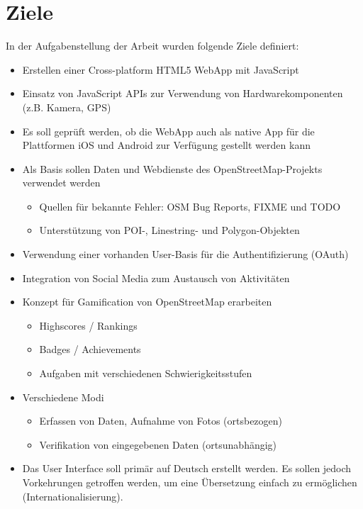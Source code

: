 \section{Ziele}
In der Aufgabenstellung der Arbeit wurden folgende Ziele definiert:
\begin{itemize}
	\item Erstellen einer Cross-platform HTML5 WebApp mit JavaScript
	\item Einsatz von JavaScript APIs zur Verwendung von Hardwarekomponenten (z.B. Kamera, GPS)
	\item Es soll geprüft werden, ob die WebApp auch als native App für die Plattformen iOS und Android zur Verfügung gestellt werden kann 
	\item Als Basis sollen Daten und Webdienste des OpenStreetMap-Projekts verwendet werden
	\begin{itemize}
		\item Quellen für bekannte Fehler: OSM Bug Reports, FIXME und TODO
		\item Unterstützung von POI-, Linestring- und Polygon-Objekten
	\end{itemize}
	\item Verwendung einer vorhanden User-Basis für die Authentifizierung (OAuth)
	\item Integration von Social Media zum Austausch von Aktivitäten
	\item Konzept für Gamification von OpenStreetMap erarbeiten
	\begin{itemize}
		\item Highscores / Rankings
		\item Badges / Achievements
		\item Aufgaben mit verschiedenen Schwierigkeitsstufen
	\end{itemize}
	\item Verschiedene Modi
	\begin{itemize}
		\item Erfassen von Daten, Aufnahme von Fotos (ortsbezogen)
		\item Verifikation von eingegebenen Daten (ortsunabhängig)
	\end{itemize}
	\item Das User Interface soll primär auf Deutsch erstellt werden. Es sollen jedoch Vorkehrungen getroffen werden, um eine Übersetzung einfach zu ermöglichen (Internationalisierung).
\end{itemize}

